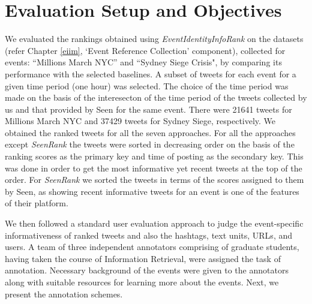 \section{Evaluation Setup and Objectives}
We evaluated the rankings obtained using \textit{EventIdentityInfoRank} on the  datasets (refer Chapter \ref{eiim}, `Event Reference Collection' component), collected for events: ``Millions March NYC'' and ``Sydney Siege Crisis", by comparing its performance with the selected baselines. A subset of tweets for each event for a given time period (one hour) was selected. The choice of the time period was made on the basis of the interesecton of the time period of the tweets collected by us and that provided by Seen for the same event. There were 21641 tweets for Millions March NYC and 37429 tweets for Sydney Siege, respectively. We obtained the ranked tweets for all the seven approaches. For all the approaches except \textit{SeenRank} the tweets were sorted in decreasing order on the basis of the ranking scores as the primary key and time of posting as the secondary key. This was done in order to get the most informative yet recent tweets at the top of the order. For \textit{SeenRank} we sorted the tweets in terms of the scores assigned to them by Seen, as showing recent informative tweets for an event is one of the features of their platform.

We then followed a standard user evaluation approach to judge the event-specific informativeness of ranked tweets and also the hashtags, text units, URLs, and users.  A team of three independent annotators comprising of graduate students, having taken the course of Information Retrieval, were assigned the task of annotation. Necessary background of the events were given to the annotators along with suitable resources for learning more about the events. Next, we present the annotation schemes.

